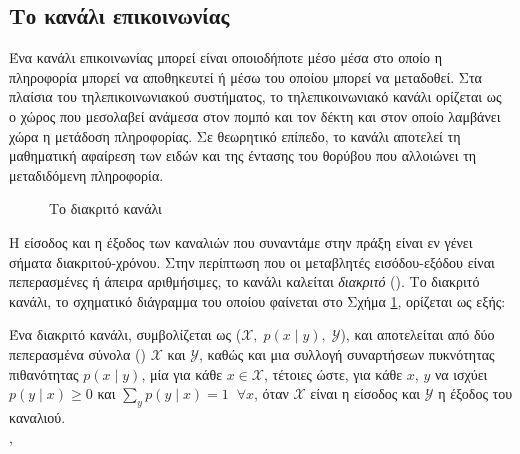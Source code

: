 \subsection*{Το κανάλι επικοινωνίας}
Ένα κανάλι επικοινωνίας μπορεί είναι οποιοδήποτε μέσο μέσα στο οποίο η πληροφορία μπορεί να αποθηκευτεί ή μέσω του οποίου μπορεί να μεταδοθεί. Στα πλαίσια του τηλεπικοινωνιακού συστήματος, το τηλεπικοινωνιακό κανάλι ορίζεται ως ο χώρος που μεσολαβεί ανάμεσα στον πομπό και τον δέκτη και στον οποίο λαμβάνει χώρα η μετάδοση πληροφορίας. Σε θεωρητικό επίπεδο, το κανάλι αποτελεί τη μαθηματική αφαίρεση των ειδών και της έντασης του θορύβου που αλλοιώνει τη μεταδιδόμενη πληροφορία.

\begin{figure}[h]
\caption{Το διακριτό κανάλι}
\label{fig:discrete channel}
\end{figure}

Η είσοδος και η έξοδος των καναλιών που συναντάμε στην πράξη είναι εν γένει σήματα διακριτού-χρόνου. Στην περίπτωση που οι μεταβλητές εισόδου-εξόδου είναι πεπερασμένες ή άπειρα αριθμήσιμες, το κανάλι καλείται \textit{διακριτό} (). Το διακριτό κανάλι, το σχηματικό διάγραμμα του οποίου φαίνεται στο Σχήμα \ref{fig:discrete channel}, ορίζεται ως εξής:

\begin{definition}
Ένα διακριτό κανάλι, συμβολίζεται ως ($\mathcal{X},\;p(x\mid{y}),\;\mathcal{Y}$), και αποτελείται από δύο πεπερασμένα σύνολα () $\mathcal{X}$ και $\mathcal{Y}$, καθώς και μια συλλογή συναρτήσεων πυκνότητας πιθανότητας $p(x\mid{y})$, μία για κάθε $x\in\mathcal{X}$, τέτοιες ώστε, για κάθε $x$, $y$ να ισχύει $p(y\mid{x})\ge0$ και $\sum\nolimits_{y}p(y\mid{x})=1\;\;\forall{x}$, όταν $\mathcal{X}$ είναι η είσοδος και $\mathcal{Y}$ η έξοδος του καναλιού. \\
\cite{cover2012elements}, \cite{proakis1994communication}
\label{def:discrete channel}
\end{definition}

